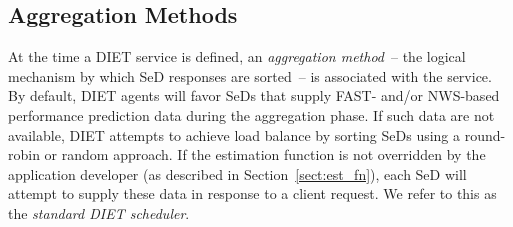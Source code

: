 


\subsection{Aggregation Methods}

At the time a DIET service is defined, an \emph{aggregation method}~--
the logical mechanism by which SeD responses are sorted~-- is
associated with the service.
By default, DIET agents will favor SeDs that supply
FAST- and/or NWS-based performance prediction data during the
aggregation phase.  If such data are
not available, DIET attempts to achieve load balance by sorting SeDs
using a round-robin or random approach.
If the estimation function is not overridden by the
application developer (as described in Section~\ref{sect:est_fn}),
each SeD will attempt to supply these data in response to a client
request.  We refer to this as the \emph{standard DIET scheduler}.

